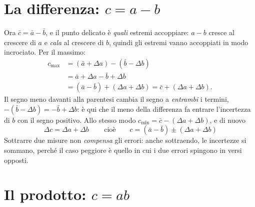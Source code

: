 \documentclass[11pt,a4paper]{article}
\begin{document}
\section*{La differenza: $c = a - b$}

Ora $\bar c = \bar a - \bar b$, e il punto delicato è \emph{quali} estremi
accoppiare: $a - b$ cresce al crescere di $a$ e \emph{cala} al crescere di
$b$, quindi gli estremi vanno accoppiati in modo incrociato. Per il massimo:
\begin{align*}
c_{\max} &= (\bar a + \Delta a) - (\bar b - \Delta b) \\
&= \bar a + \Delta a - \bar b + \Delta b\\
&= (\bar a - \bar b) + (\Delta a + \Delta b)
= \bar c + (\Delta a + \Delta b).
\end{align*}
Il segno meno davanti alla parentesi cambia il segno a \emph{entrambi} i
termini, $-(\bar b - \Delta b) = -\bar b + \Delta b$: è qui che il meno della
differenza fa entrare l'incertezza di $b$ con il segno positivo. Allo stesso
modo $c_{\min} = \bar c - (\Delta a + \Delta b)$, e di nuovo
\begin{equation*}
\boxed{\,\Delta c = \Delta a + \Delta b\,}
\qquad\text{cioè}\qquad
c = (\bar a - \bar b) \pm (\Delta a + \Delta b)
\end{equation*}
Sottrarre due misure non \emph{compensa} gli errori: anche sottraendo, le
incertezze si sommano, perché il caso peggiore è quello in cui i due errori
spingono in versi opposti.

\section*{Il prodotto: $c = ab$}
\end{document}

